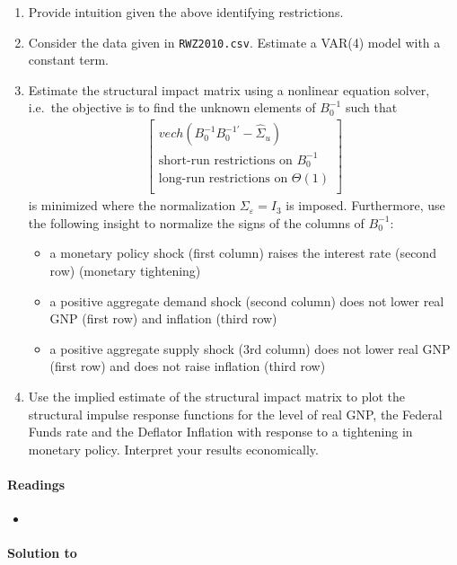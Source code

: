 \begin{enumerate}
\item Provide intuition given the above identifying restrictions.

\item Consider the data given in \texttt{RWZ2010.csv}.
Estimate a VAR(4) model with a constant term.

\item Estimate the structural impact matrix using a nonlinear equation solver,
  i.e.\ the objective is to find the unknown elements of \(B_0^{-1}\) such that
\begin{align*}
\begin{bmatrix}
vech(B_0^{-1}B_0^{-1'}-\hat{\Sigma}_u)\\
\text{short-run restrictions on }B_0^{-1}\\
\text{long-run restrictions on }\Theta(1)\\
\end{bmatrix}
\end{align*}
is minimized where the normalization \(\Sigma_\varepsilon=I_3\) is imposed.
Furthermore, use the following insight to normalize the signs of the columns of \(B_0^{-1}\):
\begin{itemize}
    \item a monetary policy shock (first column) raises the interest rate (second row) (monetary tightening)
    \item a positive aggregate demand shock (second column) does not lower real GNP (first row) and inflation (third row)
    \item a positive aggregate supply shock (3rd column) does not lower real GNP (first row) and does not raise inflation (third row)
\end{itemize}

\item Use the implied estimate of the structural impact matrix to plot the structural impulse response functions
  for the level of real GNP, the Federal Funds rate and the Deflator Inflation with response to a tightening in monetary policy.
Interpret your results economically.
\end{enumerate}

\paragraph{Readings}
\begin{itemize}
	\item \textcite[Ch.~10.4, 10.5, 11.3]{Kilian.Lutkepohl_2017_StructuralVectorAutoregressive}
\end{itemize}

\begin{solution}\textbf{Solution to }
\ifDisplaySolutions

\fi
\newpage
\end{solution}